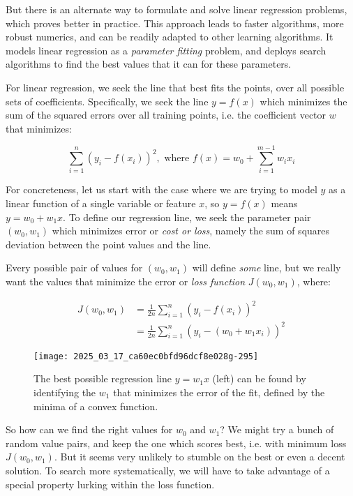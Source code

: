 \documentclass[10pt]{article}
\begin{document}
But there is an alternate way to formulate and solve linear regression problems, which proves better in practice. This approach leads to faster algorithms, more robust numerics, and can be readily adapted to other learning algorithms. It models linear regression as a \textit{parameter fitting} problem, and deploys search algorithms to find the best values that it can for these parameters.

For linear regression, we seek the line that best fits the points, over all possible sets of coefficients. Specifically, we seek the line $y=f(x)$ which minimizes the sum of the squared errors over all training points, i.e. the coefficient vector $w$ that minimizes:

\[
\sum_{i=1}^{n} \left(y_{i} - f(x_{i})\right)^{2}, \text{ where } f(x)=w_{0} + \sum_{i=1}^{m-1} w_{i} x_{i}
\]

For concreteness, let us start with the case where we are trying to model $y$ as a linear function of a single variable or feature $x$, so $y=f(x)$ means $y=w_{0}+w_{1}x$. To define our regression line, we seek the parameter pair $(w_{0}, w_{1})$ which minimizes error or \textit{cost or loss}, namely the sum of squares deviation between the point values and the line.

Every possible pair of values for $(w_{0}, w_{1})$ will define \textit{some} line, but we really want the values that minimize the error or \textit{loss function} $J(w_{0}, w_{1})$, where:

\[
\begin{aligned}
J(w_{0}, w_{1}) & = \frac{1}{2n} \sum_{i=1}^{n} \left(y_{i} - f(x_{i})\right)^{2} \\
& = \frac{1}{2n} \sum_{i=1}^{n} \left(y_{i} - (w_{0} + w_{1}x_{i})\right)^{2}
\end{aligned}
\]

\begin{figure}[h]
    \centering
    \texttt{[image: 2025\_03\_17\_ca60ec0bfd96dcf8e028g-295]}
    \caption{The best possible regression line $y=w_{1} x$ (left) can be found by identifying the $w_{1}$ that minimizes the error of the fit, defined by the minima of a convex function.}
\end{figure}

So how can we find the right values for $w_{0}$ and $w_{1}$? We might try a bunch of random value pairs, and keep the one which scores best, i.e. with minimum loss $J(w_{0}, w_{1})$. But it seems very unlikely to stumble on the best or even a decent solution. To search more systematically, we will have to take advantage of a special property lurking within the loss function.
\end{document}
